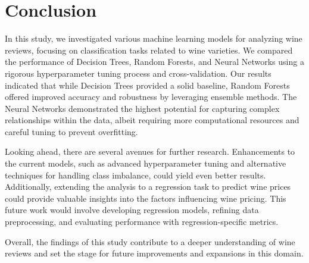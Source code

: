 \section{Conclusion}

In this study, we investigated various machine learning models for analyzing wine reviews, focusing on classification tasks related to wine varieties. We compared the performance of Decision Trees, Random Forests, and Neural Networks using a rigorous hyperparameter tuning process and cross-validation. Our results indicated that while Decision Trees provided a solid baseline, Random Forests offered improved accuracy and robustness by leveraging ensemble methods. The Neural Networks demonstrated the highest potential for capturing complex relationships within the data, albeit requiring more computational resources and careful tuning to prevent overfitting.

Looking ahead, there are several avenues for further research. Enhancements to the current models, such as advanced hyperparameter tuning and alternative techniques for handling class imbalance, could yield even better results. Additionally, extending the analysis to a regression task to predict wine prices could provide valuable insights into the factors influencing wine pricing. This future work would involve developing regression models, refining data preprocessing, and evaluating performance with regression-specific metrics.

Overall, the findings of this study contribute to a deeper understanding of wine reviews and set the stage for future improvements and expansions in this domain.
